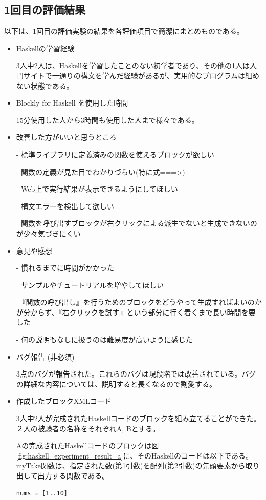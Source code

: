 \documentclass{risepaper}
\begin{document}
		\subsection{1回目の評価結果}

以下は、1回目の評価実験の結果を各評価項目で簡潔にまとめものである。

\begin{itemize}
\item Haskellの学習経験

3人中2人は、Haskellを学習したことのない初学者であり、その他の1人は入門サイトで一通りの構文を学んだ経験があるが、実用的なプログラムは組めない状態である。

\item Blockly for Haskell を使用した時間

15分使用した人から3時間も使用した人まで様々である。

\item 改善した方がいいと思うところ

- 標準ライブラリに定義済みの関数を使えるブロックが欲しい

- 関数の定義が見た目でわかりづらい(特に式===\textgreater)

- Web上で実行結果が表示できるようにしてほしい

- 構文エラーを検出して欲しい

- 関数を呼び出すブロックが右クリックによる派生でないと生成できないのが少々気づきにくい

\item 意見や感想

- 慣れるまでに時間がかかった

- サンプルやチュートリアルを増やしてほしい

-『関数の呼び出し』を行うためのブロックをどうやって生成すればよいのかが分からず、『右クリックを試す』という部分に行く着くまで長い時間を要した

- 何の説明もなしに扱うのは難易度が高いように感じた

\item バグ報告 (非必須)

3点のバグが報告された。これらのバグは現段階では改善されている。バグの詳細な内容については、説明すると長くなるので割愛する。
\item 作成したブロックXMLコード

3人中2人が完成されたHaskellコードのブロックを組み立てることができた。２人の被験者の名称をそれぞれA, Bとする。

Aの完成されたHaskellコードのブロックは図\ref{fig:haskell_experiment_result_a}に、そのHaskellのコードは以下である。myTake関数は、指定された数(第1引数)を配列(第2引数)の先頭要素から取り出して出力する関数である。
\begin{lstlisting}[basicstyle=\ttfamily\footnotesize]
nums = [1..10]


\end{lstlisting}
\end{itemize}
\end{document}
